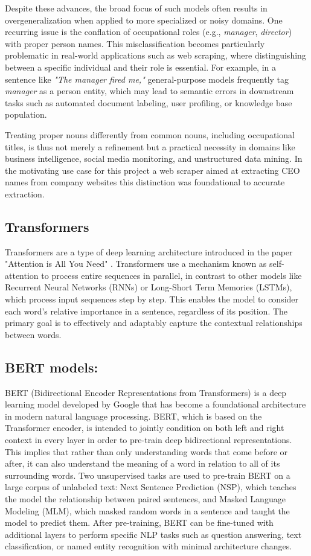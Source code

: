 \documentclass[a4paper]{usiinfbachelorproject}
\begin{document}
Despite these advances, the broad focus of such models often results in overgeneralization when applied to more specialized or noisy domains. One recurring issue is the conflation of occupational roles (e.g., \textit{manager}, \textit{director}) with proper person names. This misclassification becomes particularly problematic in real-world applications such as web scraping, where distinguishing between a specific individual and their role is essential. For example, in a sentence like \textit{"The manager fired me,"} general-purpose models frequently tag \textit{manager} as a person entity, which may lead to semantic errors in downstream tasks such as automated document labeling, user profiling, or knowledge base population.

Treating proper nouns differently from common nouns, including occupational titles, is thus not merely a refinement but a practical necessity in domains like business intelligence, social media monitoring, and unstructured data mining. In the motivating use case for this project a web scraper aimed at extracting CEO names from company websites this distinction was foundational to accurate extraction.
\subsection{Transformers}
Transformers are a type of deep learning architecture introduced in the paper "Attention is All You Need" \cite{vaswani2023attentionneed}. Transformers use a mechanism known as self-attention to process entire sequences in parallel, in contrast to other models like Recurrent Neural Networks (RNNs) or Long-Short Term Memories (LSTMs), which process input sequences step by step. This enables the model to consider each word's relative importance in a sentence, regardless of its position. The primary goal is to effectively and adaptably capture the contextual relationships between words.

\subsection{BERT models:}
BERT (Bidirectional Encoder Representations from Transformers) is a deep learning model developed by Google\cite{devlin2019bertpretrainingdeepbidirectional} that has become a foundational architecture in modern natural language processing. BERT, which is based on the Transformer encoder, is intended to jointly condition on both left and right context in every layer in order to pre-train deep bidirectional representations. This implies that rather than only understanding words that come before or after, it can also understand the meaning of a word in relation to all of its surrounding words. Two unsupervised tasks are used to pre-train BERT on a large corpus of unlabeled text: Next Sentence Prediction (NSP), which teaches the model the relationship between paired sentences, and Masked Language Modeling (MLM), which masked random words in a sentence and taught the model to predict them. After pre-training, BERT can be fine-tuned with additional layers to perform specific NLP tasks such as question answering, text classification, or named entity recognition with minimal architecture changes.
\end{document}
